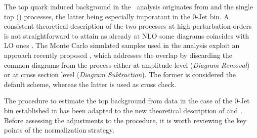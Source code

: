The top quark induced background in the \WW\ analysis originates from
\ttbar and the single top (\tw) processes, the latter being especially imporatant 
in the 0-Jet bin.
A consistent theoretical description of the two processes at high perturbation
orders is not straightforward to attain as already at NLO some \tw diagrams
coincides with LO \ttbar ones \cite{singleTopInterference}.
The Monte Carlo simulated samples used in the analysis exploit an approach
recently proposed \cite{singleTopRemoval}, which addresses the overlap by discarding
the common diagrams from the \tw process either at amplitude level 
({\it Diagram Removal}) or at cross section level ({\it Diagram Subtraction}).
The former is considered the default scheme, whereas the latter is used
as cross check.

The procedure to estimate the top background from data in the case of the 0-Jet bin
established in \cite{HWW2011} has been adapted to the new theoretical description of \ttbar and \tw.
Before assessing the adjustments to the procedure, it is worth reviewing the key points of
the normalization strategy. 

